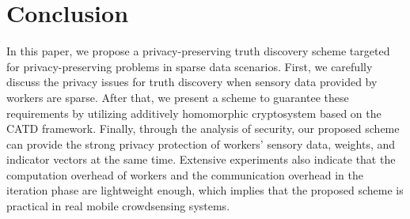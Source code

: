 \documentclass[conference]{IEEEtran}
\begin{document}
\section{Conclusion}\label{sec8}
In this paper, we propose a privacy-preserving truth discovery scheme targeted for privacy-preserving problems in sparse data scenarios.
First, we carefully discuss the privacy issues for truth discovery when sensory data provided by workers are sparse.
After that, we present a scheme to guarantee these requirements by utilizing additively homomorphic cryptosystem based on the CATD framework.
Finally, through the analysis of security, our proposed scheme can provide the strong privacy protection of workers' sensory data, weights, and indicator vectors at the same time.
Extensive experiments also indicate that the computation overhead of workers and the communication overhead in the iteration phase are lightweight enough, which implies that the proposed scheme is practical in real mobile crowdsensing systems.




\vspace{12pt}
\end{document}
